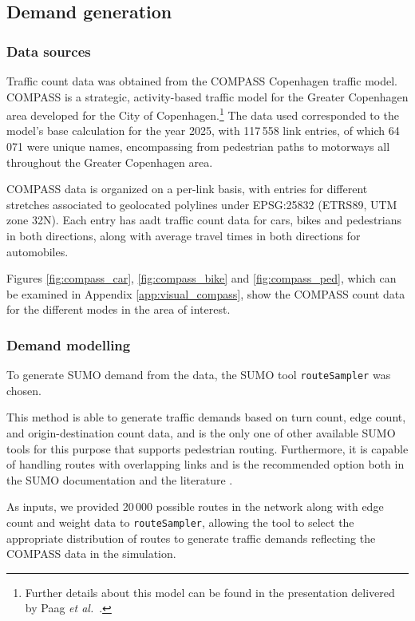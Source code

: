 \subsection{Demand generation} \label{subsec:demand_generation}
\subsubsection{Data sources} 
Traffic count data was obtained from the COMPASS Copenhagen traffic model. COMPASS is a strategic, activity-based traffic model for the Greater Copenhagen area developed for the City of Copenhagen.\footnote{Further details about this model can be found in the presentation delivered by Paag \textit{et al.}~\cite{Paag2019}.} The data used corresponded to the model's base calculation for the year 2025, with 117\,558 link entries, of which 64\,071 were unique names, encompassing from pedestrian paths to motorways all throughout the Greater Copenhagen area.

COMPASS data is organized on a per-link basis, with entries for different stretches associated to geolocated polylines under EPSG:25832 (ETRS89, UTM zone 32N). Each entry has \gls{aadt} traffic count data for cars, bikes and pedestrians in both directions, along with average travel times in both directions for automobiles.

Figures \ref{fig:compass_car}, \ref{fig:compass_bike} and \ref{fig:compass_ped}, which can be examined in Appendix \ref{app:visual_compass}, show the COMPASS count data for the different modes in the area of interest.

\subsubsection{Demand modelling} \label{subsubsec:demand_modelling}

To generate SUMO demand from the data, the SUMO tool \texttt{routeSampler} was chosen.

This method is able to generate traffic demands based on turn count, edge count, and origin-destination count data, and is the only one of other available SUMO tools for this purpose that supports pedestrian routing. Furthermore, it is capable of handling routes with overlapping links and is the recommended option both in the SUMO documentation and the literature \cite{Ostendorf2025}.

As inputs, we provided 20\,000 possible routes in the network along with edge count and weight data to \texttt{routeSampler}, allowing the tool to select the appropriate distribution of routes to generate traffic demands reflecting the COMPASS data in the simulation.

